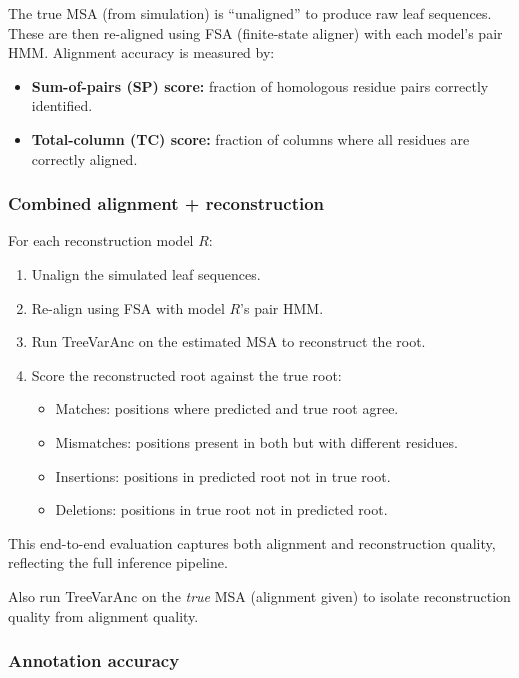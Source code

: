 The true MSA (from simulation) is ``unaligned'' to produce raw
leaf sequences.  These are then re-aligned using FSA
(finite-state aligner) with each model's pair HMM.
Alignment accuracy is measured by:
\begin{itemize}
\item \textbf{Sum-of-pairs (SP) score:}
  fraction of homologous residue pairs correctly identified.
\item \textbf{Total-column (TC) score:}
  fraction of columns where all residues are correctly aligned.
\end{itemize}

\subsubsection{Combined alignment + reconstruction}

For each reconstruction model $R$:
\begin{enumerate}
\item Unalign the simulated leaf sequences.
\item Re-align using FSA with model $R$'s pair HMM.
\item Run TreeVarAnc on the estimated MSA to reconstruct the root.
\item Score the reconstructed root against the true root:
  \begin{itemize}
  \item Matches: positions where predicted and true root agree.
  \item Mismatches: positions present in both but with different residues.
  \item Insertions: positions in predicted root not in true root.
  \item Deletions: positions in true root not in predicted root.
  \end{itemize}
\end{enumerate}
This end-to-end evaluation captures both alignment and reconstruction
quality, reflecting the full inference pipeline.

Also run TreeVarAnc on the \emph{true} MSA (alignment given)
to isolate reconstruction quality from alignment quality.

\subsubsection{Annotation accuracy}

